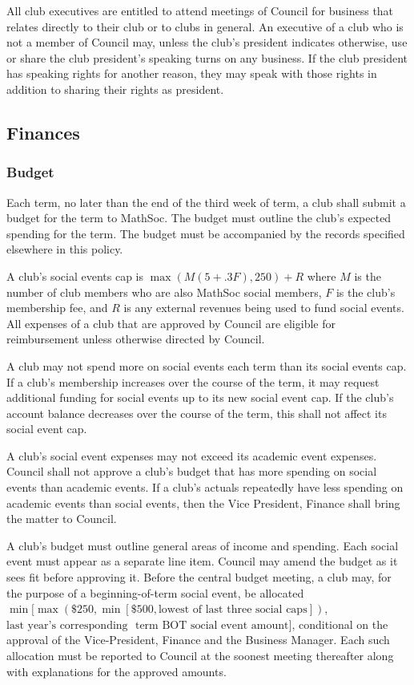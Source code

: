 All club executives are entitled to attend meetings of Council for business that
relates directly to their club or to clubs in general. An executive of a club
who is not a member of Council may, unless the club's president indicates
otherwise, use or share the club president's speaking turns on any business. If
the club president has speaking rights for another reason, they may speak with
those rights in addition to sharing their rights as president.

\subsection{Finances}
\subsubsection{Budget}
Each term, no later than the end of the third week of term, a club shall submit
a budget for the term to MathSoc. The budget must outline the club's expected
spending for the term. The budget must be accompanied by the records specified
elsewhere in this policy.

A club's social events cap is $\max(M(5 + .3F), 250) + R$ where $M$ is the
number of club members who are also MathSoc social members, $F$ is the
club's membership fee, and $R$ is any external revenues being used to fund
social events. All expenses of a club that are approved by Council are
eligible for reimbursement unless otherwise directed by Council.

A club may not spend more on social events each term than its social events cap.
If a club's membership increases over the course of the term, it may request
additional funding for social events up to its new social event cap. If the
club's account balance decreases over the course of the term, this shall not
affect its social event cap.

A club's social event expenses may not exceed its academic event expenses.
Council shall not approve a club's budget that has more spending on social
events than academic events. If a club's actuals repeatedly have less spending
on academic events than social events, then the Vice President, Finance shall
bring the matter to Council.

A club’s budget must outline general areas of income and spending. Each social event must appear as a separate line item. Council may amend the budget as it sees fit before approving it. Before the central budget meeting, a club may, for the purpose of a beginning-of-term social event, be allocated $\min[\max(\$250, \min[\$500, \text{lowest of last three social caps}])$, $\text{last year's corresponding }$ $\text{term BOT social event amount}]$, conditional on the approval of the Vice-President, Finance and the Business Manager. Each such allocation must be reported to Council at the soonest meeting thereafter along with explanations for the approved amounts. 


